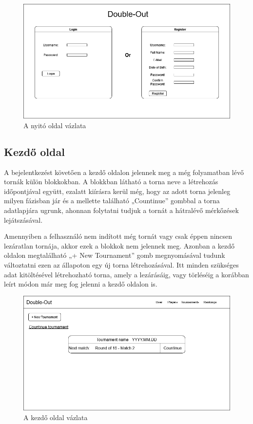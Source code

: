 \begin{figure}[h]
\centering
\includegraphics[scale=0.3]{images/LandingPage.drawio.png}
\caption{A nyitó oldal vázlata}
\label{fig:cimer}
\end{figure}

\subsection{Kezdő oldal}
A bejelentkezést követően a kezdő oldalon jelennek meg a még folyamatban lévő tornák külön blokkokban. A blokkban látható a torna neve a létrehozás időpontjával együtt, ezalatt kiírásra kerül még, hogy az adott torna jelenleg milyen fázisban jár és a mellette található „Countinue” gombbal a torna adatlapjára ugrunk, ahonnan folytatni tudjuk a tornát a hátralévő mérkőzések lejátszásával.

Amennyiben a felhasználó nem indított még tornát vagy csak éppen nincsen lezáratlan tornája, akkor ezek a blokkok nem jelennek meg. Azonban a kezdő oldalon megtalálható „+ New Tournament” gomb megnyomásával tudunk változtatni ezen az állapoton egy új torna létrehozásával. Itt minden szükséges adat kitöltésével létrehozható torna, amely a lezárásáig, vagy törléséig a korábban leírt módon már meg fog jelenni a kezdő oldalon is.

\begin{figure}[h]
\centering
\includegraphics[scale=0.3]{images/HomePage.png}
\caption{A kezdő oldal vázlata}
\label{fig:cimer}
\end{figure}

